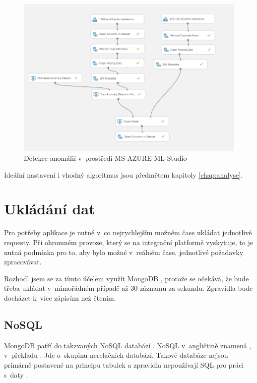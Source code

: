 \documentclass[thesis=M,czech]{FITthesis}[2012/10/20]
\newcommand{\tmpframe}[1]{\fbox{#1}}
\renewcommand{\tmpframe}[1]{#1}
\begin{document}
		\begin{figure}[htb]\centering
			\tmpframe{\includegraphics[width=\textwidth]{./img/azureTrainingAnomaly}}	
			\caption{Detekce anomálií v~prostředí MS AZURE ML Studio}
			\label{fig:anomaly_detection_azure}
		\end{figure}
		
		Ideální nastavení i vhodný algoritmus jsou předmětem kapitoly \ref{chap:analyse}.
		
	\section{Ukládání dat}
	\label{sec:data_storing}
		Pro potřeby aplikace je nutné v~co nejrychlejším možném čase ukládat jednotlivé requesty. Při ohromném provoze, který se na integrační platformě vyskytuje, to je nutná podmínka pro to, aby bylo možné v~reálném čase, jednotlivé požadavky zpracovávat.

		Rozhodl jsem se za tímto účelem využít MongoDB \cite{mongoDB}, protože se očekává, že bude třeba ukládat v~mimořádném případě až 30 záznamů za sekundu. Zpravidla bude docházet k~více zápisům než čtením.

		\subsection{NoSQL}
			MongoDB patří do takzvaných NoSQL databází \cite{mongoDB}. NoSQL v~angličtině znamená  \cite{Moniruzzaman_2013}, v~překladu . Jde o~skupinu nerelačních databází. Takové databáze nejsou primárně postavené na principu tabulek a zpravidla nepoužívají SQL pro práci s~daty \cite{Moniruzzaman_2013}.
\end{document}
